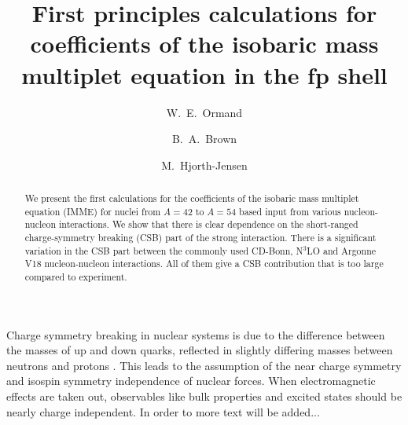 \documentclass[twocolumn,aps,tightenlines,floatfix,showpacs]{revtex4}
\begin{document}
\title{First principles calculations for coefficients of the isobaric
mass multiplet equation in the fp shell}


\author{W.~E.~Ormand}
\author{B.~A.~Brown} 
\author{M.~Hjorth-Jensen}

\begin{abstract}
We present the first calculations for the coefficients of the isobaric
mass multiplet equation (IMME)
for nuclei from $A=42$ to $A=54$ based input from various nucleon-nucleon interactions.
We show that there is clear dependence on the short-ranged charge-symmetry
breaking (CSB) part of the strong interaction. There is a significant
variation in the CSB part between the commonly
used CD-Bonn, N$^3$LO and Argonne V18 nucleon-nucleon
interactions. All of them give a CSB contribution that is too large
compared to experiment.
\end{abstract}

\pacs{}


\maketitle


Charge symmetry breaking in nuclear systems is due to the difference between the masses of up and down 
quarks, reflected in slightly differing masses between neutrons and protons \cite{miller2006}. 
This leads to the assumption of the near 
charge symmetry and isospin symmetry independence of nuclear forces.
When electromagnetic effects are taken out, observables like bulk properties and excited states 
should be nearly charge independent. In order to more text will be added...
\end{document}
